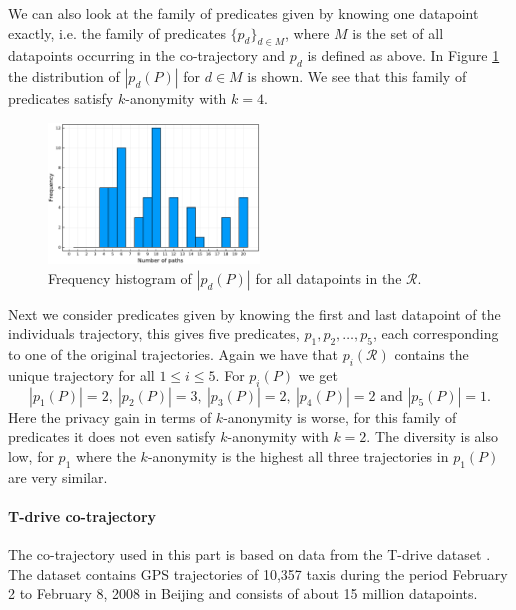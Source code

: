\documentclass[12pt]{article}
\newcommand{\data}{d}
\newcommand{\cotraj}{\mathcal{R}}
\newcommand{\pred}{p}
\newcommand{\paths}{P}
\theoremstyle{definition}
\begin{document}
We can also look at the family of predicates given by knowing one
datapoint exactly, i.e. the family of predicates
\(\{\pred_{\data}\}_{\data \in M}\), where \(M\) is the set of all
datapoints occurring in the co-trajectory and \(\pred_{\data}\) is
defined as above. In Figure \ref{fig:paths-dist} the distribution of
\(|\pred_{\data}(\paths)|\) for \(\data \in M\) is shown. We see that
this family of predicates satisfy \(k\)-anonymity with \(k = 4\).

\begin{figure}
  \centering
  \includegraphics[width=0.5\textwidth]{figures/numpaths_measurements.pdf}
  \caption{Frequency histogram of \(|\pred_{\data}(\paths)|\) for all
    datapoints in the \(\cotraj\).}
  \label{fig:paths-dist}
\end{figure}

Next we consider predicates given by knowing the first and last
datapoint of the individuals trajectory, this gives five predicates,
\(\pred_{1}, \pred_{2}, \dots, \pred_{5}\), each corresponding to one
of the original trajectories. Again we have that
\(\pred_{i}(\cotraj)\) contains the unique trajectory for all
\(1 \leq i \leq 5\). For \(\pred_{i}(\paths)\) we get
\begin{equation*}
  |\pred_{1}(\paths)| = 2,\
  |\pred_{2}(\paths)| = 3,\
  |\pred_{3}(\paths)| = 2,\
  |\pred_{4}(\paths)| = 2 \text{ and }
  |\pred_{5}(\paths)| = 1.
\end{equation*}
Here the privacy gain in terms of \(k\)-anonymity is worse, for this
family of predicates it does not even satisfy \(k\)-anonymity with
\(k = 2\). The diversity is also low, for \(\pred_{1}\) where the
\(k\)-anonymity is the highest all three trajectories in
\(\pred_{1}(\paths)\) are very similar.

\paragraph{T-drive co-trajectory}
The co-trajectory used in this part is based on data from the T-drive
dataset \cite{yuan_driving_2011, yuan_t-drive:_2010}. The dataset
contains GPS trajectories of 10,357 taxis during the period February 2
to February 8, 2008 in Beijing and consists of about 15 million
datapoints.
\end{document}
